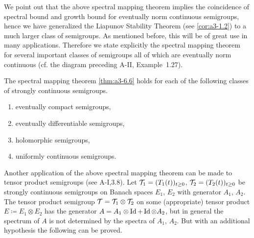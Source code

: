 We point out that the above spectral mapping theorem implies the coincidence of spectral bound and growth bound for eventually norm continuous semigroups, hence we have generalized the Liapunov Stability Theorem (see \ref{cor:a3-1.2}) to a much larger class of semigroups.
As mentioned before, this will be of great use in many applications.
Therefore we state explicitly the spectral mapping theorem for several important classes of semigroups all of which are eventually norm continuous (cf. the diagram preceding A-II, Example~1.27).
\begin{corollary}\label{cor:a3-6.7}
The spectral mapping theorem \ref{thm:a3-6.6}
holds for each of the following classes of strongly continuous semigroups.
\begin{enumerate}[\upshape (i)]
\item 
eventually compact semigroups,

\item 
eventually differentiable semigroups,

\item 
holomorphic semigroups,

\item 
uniformly continuous semigroups.
\end{enumerate}
\end{corollary}
Another application of the above spectral mapping theorem can be made to tensor product semigroups (see A-I,3.8).
Let $\mathcal{T}_{1} = (T_{1}(t))_{t\geq 0}$, $\mathcal{T}_{2} = (T_{2}(t))_{t\geq 0}$ be strongly continuous semigroups on Banach spaces $E_{1}$, $E_{2}$ with generator $A_{1}$, $A_{2}$.
The tensor product semigroup $\mathcal{T} = \mathcal{T}_{1} \otimes \mathcal{T}_{2}$ on some (appropriate) tensor product $E \coloneqq E_{1} \otimes E_{2}$ has the generator $A = A_{1}\otimes\operatorname{Id} + \operatorname{Id}\otimes A_{2}$, but in general the spectrum of $A$ is not determined by the spectra of $A_{1}$, $A_{2}$.
But with an additional hypothesis the following can be proved.

\phantom{x}

